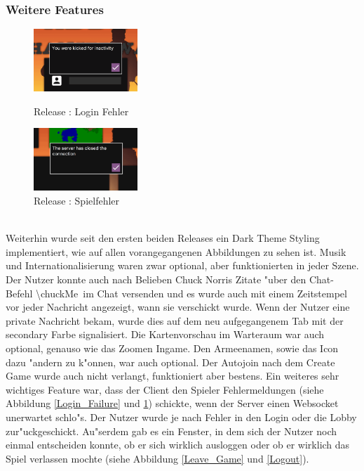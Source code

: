 \documentclass[12pt, titlepage]{scrartcl}
\newcommand{\RN}[1]{%
	\textup{\uppercase\expandafter{\romannumeral#1}}%
}
\begin{document}
		    \subsubsection{Weitere Features}
		        \begin{figure}
                    \begin{center}
                        \includegraphics[width=0.35\textwidth]{images/old_state/additional/LoginFailure.png}
                        \caption{Release \RN{2}: Login Fehler}
                        \label{Login_Failure}
                    \end{center}
                    \begin{center}
                        \includegraphics[width=0.35\textwidth]{images/old_state/additional/WaitingRoomFailure.png}
                        \caption{Release \RN{2}: Spielfehler}
                        \label{Game_Failure}
                    \end{center}
                \end{figure}
		        \ \\ Weiterhin wurde seit den ersten beiden Releases ein Dark Theme Styling implementiert, wie auf allen vorangegangenen Abbildungen zu sehen ist. Musik und Internationalisierung waren zwar optional, aber funktionierten in jeder Szene. Der Nutzer konnte auch nach Belieben Chuck Norris Zitate "uber den Chat-Befehl \glqq \textbackslash chuckMe\grqq\ im Chat versenden und es wurde auch mit einem Zeitstempel vor jeder Nachricht angezeigt, wann sie verschickt wurde. Wenn der Nutzer eine private Nachricht bekam, wurde dies auf dem neu aufgegangenem Tab mit der secondary Farbe signalisiert. Die Kartenvorschau im Warteraum war auch optional, genauso wie das Zoomen Ingame. Den Armeenamen, sowie das Icon dazu "andern zu k"onnen, war auch optional. Der Autojoin nach dem Create Game wurde auch nicht verlangt, funktioniert aber bestens. Ein weiteres sehr wichtiges Feature war, dass der Client den Spieler Fehlermeldungen (siehe Abbildung \ref{Login_Failure} und \ref{Game_Failure}) schickte, wenn der Server einen Websocket unerwartet schlo"s. Der Nutzer wurde je nach Fehler in den Login oder die Lobby zur"uckgeschickt. Au"serdem gab es ein Fenster, in dem sich der Nutzer noch einmal entscheiden konnte, ob er sich wirklich ausloggen oder ob er wirklich das Spiel verlassen mochte (siehe Abbildung \ref{Leave_Game} und \ref{Logout}). \\
\end{document}
